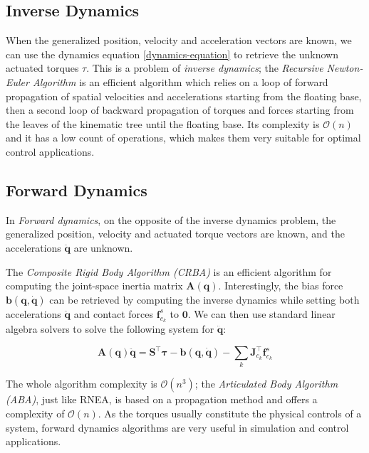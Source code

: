 \subsection{Inverse Dynamics}

When the generalized position, velocity and acceleration vectors are
known, we can use the dynamics equation \ref{dynamics-equation} to
retrieve the unknown actuated torques $\mathbb{\tau}$. This is a
problem of \emph{inverse dynamics}; the \emph{Recursive Newton-Euler
  Algorithm} is an efficient algorithm which relies on a loop of
forward propagation of spatial velocities and accelerations starting
from the floating base, then a second loop of backward propagation of
torques and forces starting from the leaves of the kinematic tree
until the floating base. Its complexity is $\mathcal{O}(n)$ and it has
a low count of operations, which makes them very suitable for optimal
control applications.

\subsection{Forward Dynamics}

In \emph{Forward dynamics}, on the opposite of the inverse dynamics
problem, the generalized position, velocity and actuated torque
vectors are known, and the accelerations $\ddot{\mathbf{q}}$ are
unknown.

The \emph{Composite Rigid Body Algorithm (CRBA)} is an efficient
algorithm for computing the joint-space inertia matrix
$\mathbf{A}(\mathbf{q})$. Interestingly, the bias force
$\mathbf{b}(\mathbf{q},\dot{\mathbf{q}})$ can be retrieved by computing the
inverse dynamics while setting both accelerations $\ddot{\mathbf{q}}$
and contact forces $\mathbf{f}^s_{c_k}$ to $\mathbf{0}$. We can then
use standard linear algebra solvers to solve the following system for
$\ddot{\mathbf{q}}$:

\begin{equation}
  \mathbf{A}(\mathbf{q})\ddot{\mathbf{q}} =
  \mathbf{S}^\top\boldsymbol{\tau} -
  \mathbf{b}(\mathbf{q},\dot{\mathbf{q}}) -
  \sum_k\mathbf{J}_{c_k}^\top\mathbf{f}^s_{c_k}
\end{equation}

The whole algorithm complexity is $\mathcal{O}(n^3)$; the
\emph{Articulated Body Algorithm (ABA)}, just like RNEA, is based on a
propagation method and offers a complexity of $\mathcal{O}(n)$. As the
torques usually constitute the physical controls of a system, forward
dynamics algorithms are very useful in simulation and control
applications.

